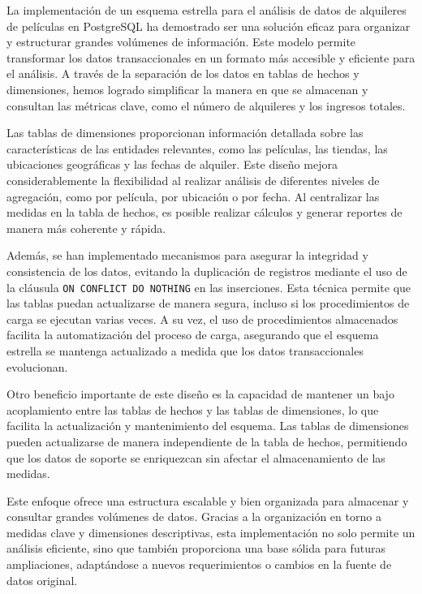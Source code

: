 \documentclass{article}
\begin{document}
La implementación de un esquema estrella para el análisis de datos de alquileres de películas en PostgreSQL ha demostrado ser una solución eficaz para organizar y estructurar grandes volúmenes de información. Este modelo permite transformar los datos transaccionales en un formato más accesible y eficiente para el análisis. A través de la separación de los datos en tablas de hechos y dimensiones, hemos logrado simplificar la manera en que se almacenan y consultan las métricas clave, como el número de alquileres y los ingresos totales.

Las tablas de dimensiones proporcionan información detallada sobre las características de las entidades relevantes, como las películas, las tiendas, las ubicaciones geográficas y las fechas de alquiler. Este diseño mejora considerablemente la flexibilidad al realizar análisis de diferentes niveles de agregación, como por película, por ubicación o por fecha. Al centralizar las medidas en la tabla de hechos, es posible realizar cálculos y generar reportes de manera más coherente y rápida.

Además, se han implementado mecanismos para asegurar la integridad y consistencia de los datos, evitando la duplicación de registros mediante el uso de la cláusula \texttt{ON CONFLICT DO NOTHING} en las inserciones. Esta técnica permite que las tablas puedan actualizarse de manera segura, incluso si los procedimientos de carga se ejecutan varias veces. A su vez, el uso de procedimientos almacenados facilita la automatización del proceso de carga, asegurando que el esquema estrella se mantenga actualizado a medida que los datos transaccionales evolucionan.

Otro beneficio importante de este diseño es la capacidad de mantener un bajo acoplamiento entre las tablas de hechos y las tablas de dimensiones, lo que facilita la actualización y mantenimiento del esquema. Las tablas de dimensiones pueden actualizarse de manera independiente de la tabla de hechos, permitiendo que los datos de soporte se enriquezcan sin afectar el almacenamiento de las medidas.

Este enfoque ofrece una estructura escalable y bien organizada para almacenar y consultar grandes volúmenes de datos. Gracias a la organización en torno a medidas clave y dimensiones descriptivas, esta implementación no solo permite un análisis eficiente, sino que también proporciona una base sólida para futuras ampliaciones, adaptándose a nuevos requerimientos o cambios en la fuente de datos original.
\end{document}
